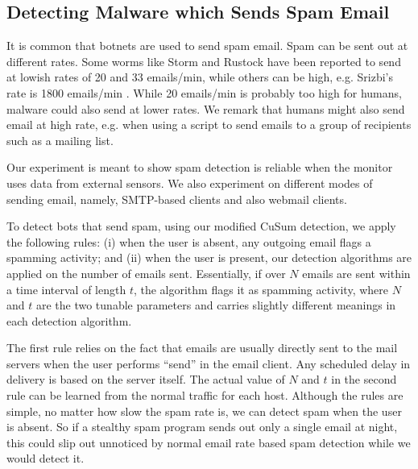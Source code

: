 \subsection{Detecting Malware which Sends Spam Email} \label{subsec:spam}

It is common that botnets are used to send spam email.
Spam can be sent out at different rates.
Some worms like Storm and Rustock have been reported to send at lowish
rates of 20 and 33 emails/min, while others can be high, e.g. Srizbi's rate is
1800 emails/min \cite{john2009studying}. While 20 emails/min is probably too
high for humans, malware could also send at lower rates.
We remark that humans might also send email at high rate, e.g.
when using a script to send emails to a group of recipients such 
as a mailing list.

Our experiment is meant to show
spam detection is reliable when the monitor uses
data from external sensors.
We also experiment on
different modes of sending email, namely,
SMTP-based clients and also webmail clients.


To detect bots that send spam, using our modified CuSum detection, we apply the following rules: (i) when
the user is absent, any outgoing email flags a spamming activity; and
(ii) when the user is present, our detection algorithms are applied on the
number of emails sent. Essentially, if over $N$ emails are sent
within a time interval of length $t$, the algorithm flags it as
spamming activity, where $N$ and $t$ are the two tunable parameters and carries slightly different meanings in each detection algorithm.

The first rule relies on the fact that emails are usually directly
sent to the mail servers when the user performs ``send''
in the email client. Any scheduled
delay in delivery is based on the server itself. The actual value of
$N$ and $t$ in the second rule can be learned from the normal
traffic for each host.
Although the rules are simple, no matter how slow the spam rate
is, we can detect spam when the user is absent. So if a
stealthy spam program sends out only a single email at night,
this could slip out unnoticed by normal email rate based spam detection
while we would detect it.

